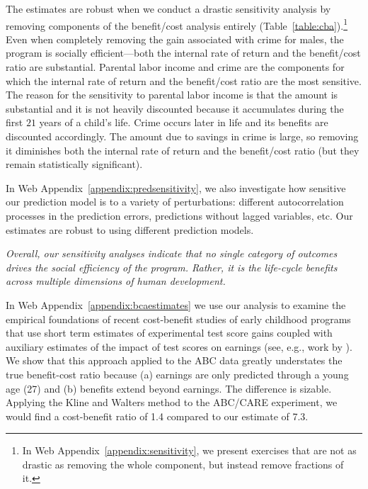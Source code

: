 The estimates are robust when we conduct a drastic sensitivity analysis by removing components of the benefit/cost analysis entirely (Table~\ref{table:cba}).\footnote{In Web Appendix~\ref{appendix:sensitivity}, we present exercises that are not as drastic as removing the whole component, but instead remove fractions of it.} Even when completely removing the gain associated with crime for males, the program is socially efficient---both the internal rate of return and the benefit/cost ratio are substantial. Parental labor income and crime are the components for which the internal rate of return and the benefit/cost ratio are the most sensitive. The reason for the sensitivity to parental labor income is that the amount is substantial and it is not heavily discounted because it accumulates during the first $21$ years of a child's life. Crime occurs later in life and its benefits are discounted accordingly. The amount due to savings in crime is large, so removing it diminishes both the internal rate of return and the benefit/cost ratio (but they remain statistically significant).

In Web Appendix~\ref{appendix:predsensitivity}, we also investigate how sensitive our prediction model is to a variety of perturbations: different autocorrelation processes in the prediction errors, predictions without lagged variables, etc. Our estimates are robust to using different prediction models.

\textit{Overall, our sensitivity analyses indicate that no single category of outcomes drives the social efficiency of the program. Rather, it is the life-cycle benefits across multiple dimensions of human development.}

In Web Appendix~\ref{appendix:bcaestimates} we use our analysis to examine the empirical foundations of recent cost-benefit studies of early childhood programs that use short term estimates of experimental test score gains coupled with auxiliary estimates of the impact of test scores on earnings (see, e.g., work by \citealp{Kline_Walters_2016_QJE}). We show that this approach applied to the ABC data greatly understates the true benefit-cost ratio because (a) earnings are only predicted through a young age (27) and (b) benefits extend beyond earnings. The difference is sizable. Applying the Kline and Walters method to the ABC/CARE experiment, we would find a cost-benefit ratio of 1.4 compared to our estimate of 7.3.

